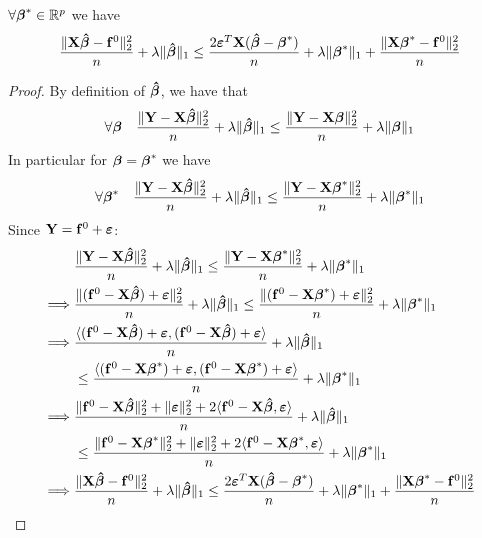 \begin{lemma}
    $\forall \bta^* \in \R^p$ we have
    \begin{equation}
        \frac{\|\X \btahat - \mathbf{f}^0 \|_{2}^{2}}{n} + \lambda\| \btahat \|_{1} \leq \frac{2 \eps^T \X (\btahat - \bta^*)}{n} + \lambda \| \bta^*\|_{1} + \frac{\|\X \bta^* - \mathbf{f}^0\|_{2}^{2}}{n}
    \end{equation}
\end{lemma}
\begin{proof}
    By definition of $\btahat$, we have that
    $$
        \forall \bta \quad \frac{\| \Y -\X \btahat \|_{2}^{2}}{n} + \lambda \| \btahat \|_{1} \leq \frac{\|\Y-\X \bta \|_{2}^{2}}{n}+\lambda \| \bta \|_{1}
    $$
    In particular for $\bta = \bta^*$ we have
    $$
        \forall \bta^* \quad \frac{\| \Y -\X \btahat \|_{2}^{2}}{n} + \lambda \| \btahat \|_{1} \leq \frac{\|\Y-\X \bta^* \|_{2}^{2}}{n}+\lambda \| \bta^* \|_{1}
    $$
    Since $\Y = \mathbf{f}^0 + \eps$:
    \begin{align*}
                 & \frac{\|\Y  - \X \btahat \|_{2}^{2}}{n} + \lambda \| \btahat\|_{1} \leq \frac{\| \Y  - \X \bta^* \|_2^2}{n}+\lambda\|\bta^{*}\|_{1}                                                       \\
        \implies &
        \frac{\| (\mathbf{f}^0 - \X \btahat ) + \eps \|_{2}^{2}}{n} + \lambda\| \btahat \|_{1} \leq \frac{ \| (\mathbf{f}^0 - \X \bta^*) + \eps \|_{2}^{2}}{n}+\lambda \| \bta^*\|_{1}                       \\
        \implies &
        \frac{\langle (\mathbf{f}^0 - \X \btahat ) + \eps, (\mathbf{f}^0 - \X \btahat ) + \eps \rangle}{n} + \lambda\| \btahat \|_{1}                                                                        \\
                 & \leq \frac{ \langle (\mathbf{f}^0 - \X \bta^*) + \eps, (\mathbf{f}^0 - \X \bta^*) + \eps \rangle}{n}+\lambda \| \bta^*\|_{1}                                                              \\
        \implies &
        \frac{\|\mathbf{f}^0 - \X \btahat \|_{2}^{2} + \| \eps \|_{2}^{2} + 2\langle \mathbf{f}^0 - \X \btahat, \eps \rangle}{n} + \lambda\| \btahat \|_{1}                                                  \\
                 & \leq \frac{\|\mathbf{f}^0 - \X \bta^* \|_{2}^{2} + \| \eps \|_{2}^{2} + 2\langle \mathbf{f}^0 - \X \bta^*, \eps \rangle}{n}+\lambda \| \bta^*\|_{1}                                       \\
        \implies &
        \frac{\|\X \btahat - \mathbf{f}^0 \|_{2}^{2}}{n} + \lambda\| \btahat \|_{1} \leq \frac{2 \eps^T \X (\btahat - \bta^*)}{n} + \lambda \| \bta^*\|_{1} + \frac{\|\X \bta^* - \mathbf{f}^0\|_{2}^{2}}{n} \\
    \end{align*}
\end{proof}

